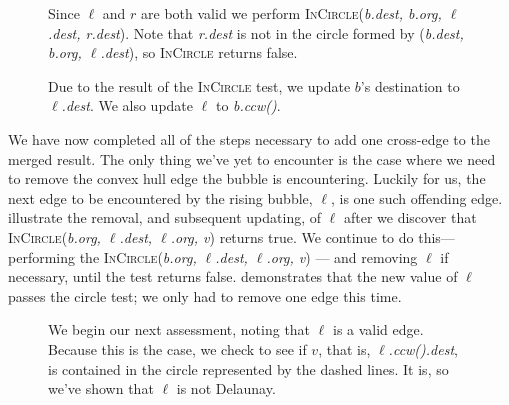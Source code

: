 \documentclass[12pt,twoside]{reedthesis}
\begin{document}
      \begin{figure}[H]
        \ContinuedFloat
        \centering
        \begin{subtable}{\textwidth}
          \centering
          
          \caption{Since $\ell$ and $r$ are both valid we perform \textsc{InCircle}(\textit{b.dest, b.org, $\ell$.dest, r.dest}). Note that \textit{r.dest} is not in the circle formed by (\textit{b.dest, b.org, $\ell$.dest}), so \textsc{InCircle} returns false.}
          \label{fig:del_knit4}
        \end{subtable}
      \end{figure}

      \begin{figure}[H]
        \ContinuedFloat
        \centering
        \begin{subtable}{\textwidth}
          \centering
          
          \caption{Due to the result of the \textsc{InCircle} test, we update $b$'s destination to \textit{$\ell$.dest}. We also update $\ell$ to \textit{b.ccw()}.}
          \label{fig:del_knit5}
        \end{subtable}
      \end{figure}

      We have now completed all of the steps necessary to add one cross-edge to the merged result. The only thing we've yet to encounter is the case where we need to remove the convex hull edge the bubble is encountering. Luckily for us, the next edge to be encountered by the rising bubble, $\ell$, is one such offending edge.  illustrate the removal, and subsequent updating, of $\ell$ after we discover that \textsc{InCircle}(\textit{b.org, $\ell$.dest, $\ell$.org, v}) returns true. We continue to do this--- performing the \textsc{InCircle}(\textit{b.org, $\ell$.dest, $\ell$.org, v}) --- and removing $\ell$ if necessary, until the test returns false.  demonstrates that the new value of $\ell$ passes the circle test; we only had to remove one edge this time.

      \begin{figure}[H]
        \ContinuedFloat
        \centering
        \begin{subtable}{\textwidth}
          \centering
          
          \caption{We begin our next assessment, noting that $\ell$ is a valid edge. Because this is the case, we check to see if $v$, that is, \textit{$\ell$.ccw().dest}, is contained in the circle represented by the dashed lines. It is, so we've shown that $\ell$ is not Delaunay.}
          \label{fig:del_knit6}
        \end{subtable}
      \end{figure}
\end{document}
